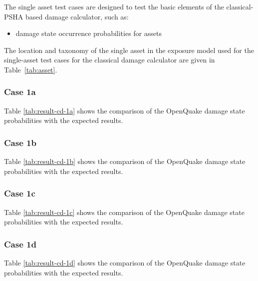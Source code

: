The single asset test cases are designed to test the basic elements of the classical-PSHA based damage calculator, such as:

\begin{itemize}
\item damage state occurrence probabilities for assets
\end{itemize}

The location and taxonomy of the single asset in the exposure model used for the single-asset test cases for the classical damage calculator are given in Table~\ref{tab:asset}.


\subsubsection{Case 1a}



Table \ref{tab:result-cd-1a} shows the comparison of the OpenQuake damage state probabilities with the expected results.

\subsubsection{Case 1b}



Table \ref{tab:result-cd-1b} shows the comparison of the OpenQuake damage state probabilities with the expected results.

\subsubsection{Case 1c}



Table \ref{tab:result-cd-1c} shows the comparison of the OpenQuake damage state probabilities with the expected results.

\subsubsection{Case 1d}



Table \ref{tab:result-cd-1d} shows the comparison of the OpenQuake damage state probabilities with the expected results.
